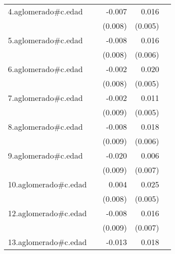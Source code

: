 {\begin{longtable}{l*{4}{D{.}{.}{-1}}}
\addlinespace
4.aglomerado#c.edad&                     &      -0.007         &       0.016\sym{**} &                     \\
            &                     &     (0.008)         &     (0.005)         &                     \\
\addlinespace
5.aglomerado#c.edad&                     &      -0.008         &       0.016\sym{**} &                     \\
            &                     &     (0.008)         &     (0.006)         &                     \\
\addlinespace
6.aglomerado#c.edad&                     &      -0.002         &       0.020\sym{***}&                     \\
            &                     &     (0.008)         &     (0.005)         &                     \\
\addlinespace
7.aglomerado#c.edad&                     &      -0.002         &       0.011\sym{*}  &                     \\
            &                     &     (0.009)         &     (0.005)         &                     \\
\addlinespace
8.aglomerado#c.edad&                     &      -0.008         &       0.018\sym{**} &                     \\
            &                     &     (0.009)         &     (0.006)         &                     \\
\addlinespace
9.aglomerado#c.edad&                     &      -0.020\sym{*}  &       0.006         &                     \\
            &                     &     (0.009)         &     (0.007)         &                     \\
\addlinespace
10.aglomerado#c.edad&                     &       0.004         &       0.025\sym{***}&                     \\
            &                     &     (0.008)         &     (0.005)         &                     \\
\addlinespace
12.aglomerado#c.edad&                     &      -0.008         &       0.016\sym{*}  &                     \\
            &                     &     (0.009)         &     (0.007)         &                     \\
\addlinespace
13.aglomerado#c.edad&                     &      -0.013         &       0.018\sym{***}&                     \\

\end{longtable}}
